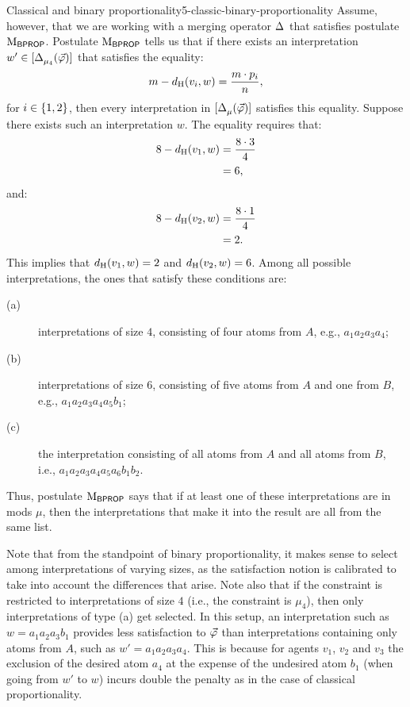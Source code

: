 \begin{xmpl}{Classical and binary proportionality}{5-classic-binary-proportionality}
	Assume, however, that we are working with a merging operator $\mer{}{}$ that satisfies postulate 
	$\ppm{\BPROP}$.
	Postulate $\ppm{\BPROP}$ tells us that if there exists an 
	interpretation $w'\in\mods{\mer{}{\mu_4}(\P)}$
	that satisfies the equality:
	$$m-\dd_\hamming(v_i,w)=\frac{m\cdot p_i}{n},$$
	for $i\in\set{1,2}$,
	then every interpretation in $\mods{\mer{}{\mu}(\P)}$ satisfies this equality.
	Suppose there exists such an interpretation $w$.
	The equality requires that:
	\begin{align*}
	8-\dd_\hamming(v_1,w)&=\frac{8\cdot 3}{4}\\
	&=6,
	\end{align*}
	and:
	\begin{align*}
	8-\dd_\hamming(v_2,w)&=\frac{8\cdot 1}{4}\\
	&=2.
	\end{align*}	
	This implies that $\dd_\hamming(v_1,w)=2$ and $\dd_\hamming(v_2,w)=6$.
	Among all possible interpretations, the ones that satisfy these conditions are:
	\begin{description}
		\item[(a)] interpretations of size $4$, consisting of four atoms from $A$, e.g., $a_1a_2a_3a_4$;
		\item[(b)] interpretations of size $6$, consisting of five atoms from $A$ and 
		one from $B$, e.g., $a_1a_2a_3a_4a_5b_1$;
		\item[(c)] the interpretation consisting of all atoms from $A$ and all atoms from $B$, i.e., $a_1a_2a_3a_4a_5a_6b_1b_2$.
	\end{description}
	Thus, postulate $\ppm{\BPROP}$ says that if at least one of these interpretations are in mods $\mu$, then 
	the interpretations that make it into the result are all from the same list.
	
	Note that from the standpoint of binary proportionality, it makes sense to select among interpretations
	of varying sizes, as the satisfaction notion is calibrated to take into account the differences that arise.
	Note also that if the constraint is restricted to interpretations of size $4$ (i.e., the constraint is $\mu_4$),
	then only interpretations of type (a) get selected.
	In this setup, an interpretation such as $w=a_1a_2a_3b_1$
	provides less satisfaction to $\P$ than 
	interpretations containing only atoms from $A$, such as $w'=a_1a_2a_3a_4$.
	This is because for agents $v_1$, $v_2$ and $v_3$ the exclusion of the desired atom $a_4$ at the expense of 
	the undesired atom $b_1$ (when going from $w'$ to $w$)
	incurs double the penalty as in the case of classical  proportionality.
	

\end{xmpl}
